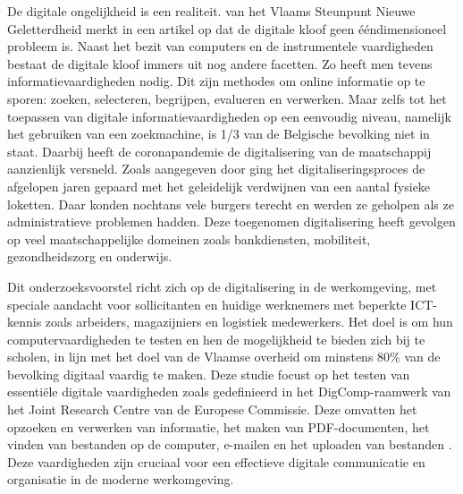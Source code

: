 De digitale ongelijkheid is een realiteit. \textcite{IedereenDigitaleKloof} van het Vlaams Steunpunt Nieuwe Geletterdheid merkt in een artikel op dat de digitale kloof geen ééndimensioneel probleem is. Naast het bezit van computers en de instrumentele vaardigheden bestaat de digitale kloof immers uit nog andere facetten. Zo heeft men tevens informatievaardigheden nodig. Dit zijn methodes om online informatie op te sporen: zoeken, selecteren, begrijpen, evalueren en verwerken. Maar zelfs tot het toepassen van digitale informatievaardigheden op een eenvoudig niveau, namelijk het gebruiken van een zoekmachine, is 1/3 van de Belgische bevolking niet in staat.
Daarbij heeft de coronapandemie de digitalisering van de maatschappij aanzienlijk versneld. Zoals aangegeven door \textcite{VlaamseVeerkracht} ging het digitaliseringsproces de afgelopen jaren gepaard met het geleidelijk verdwijnen van een aantal fysieke loketten. Daar konden nochtans vele burgers terecht en werden ze geholpen als ze administratieve problemen hadden. Deze toegenomen digitalisering heeft gevolgen op veel maatschappelijke domeinen zoals bankdiensten, mobiliteit, gezondheidszorg en onderwijs.

Dit onderzoeksvoorstel richt zich op de digitalisering in de werkomgeving, met speciale aandacht voor sollicitanten en huidige werknemers met beperkte ICT-kennis zoals arbeiders, magazijniers en logistiek medewerkers. Het doel is om hun computervaardigheden te testen en hen de mogelijkheid te bieden zich bij te scholen, in lijn met het doel van de Vlaamse overheid om minstens 80\% van de bevolking digitaal vaardig te maken.
Deze studie focust op het testen van essentiële digitale vaardigheden zoals gedefinieerd in het DigComp-raamwerk van het Joint Research Centre van de Europese Commissie. Deze omvatten het opzoeken en verwerken van informatie, het maken van PDF-documenten, het vinden van bestanden op de computer, e-mailen en het uploaden van bestanden \autocite{DigCompFramework}. Deze vaardigheden zijn cruciaal voor een effectieve digitale communicatie en organisatie in de moderne werkomgeving.

